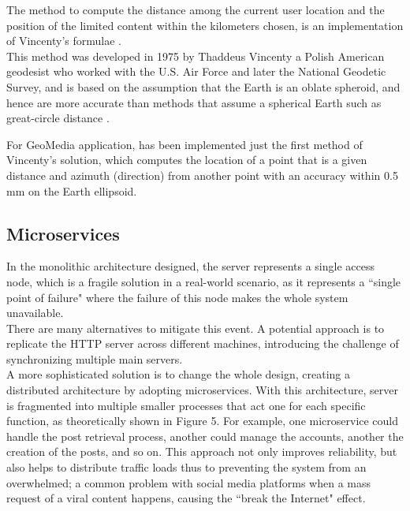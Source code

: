 \documentclass[conference]{IEEEtran}
\begin{document}
The method to compute the distance among the current user location and the position of the limited content within the kilometers chosen, is an implementation of Vincenty's formulae \cite{Vincenty}.
\\
This method was developed in 1975 by Thaddeus Vincenty \cite{ThaddeusVincenty} a Polish American geodesist who worked with the U.S. Air Force and later the National Geodetic Survey, and is based on the assumption that the Earth is an oblate spheroid, and hence are more accurate than methods that assume a spherical Earth such as great-circle distance \cite{GCDWiki}. 

For GeoMedia application, has been implemented just the first method of Vincenty's solution, which computes the location of a point that is a given distance and azimuth (direction) from another point with an accuracy within 0.5 mm on the Earth ellipsoid.


\subsection{Microservices}
In the monolithic architecture designed, the server represents a single access node, which is a fragile solution in a real-world scenario, as it represents a ``single point of failure" where the failure of this node makes the whole system unavailable.
\\
There are many alternatives to mitigate this event. A potential approach is to replicate the HTTP server across different machines, introducing the challenge of synchronizing multiple main servers.
\\
A more sophisticated solution is to change the whole design, creating a distributed architecture by adopting microservices\cite{b6}. With this architecture, server is fragmented into multiple smaller processes that act one for each specific function, as theoretically shown in Figure 5.
For example, one microservice could handle the post retrieval process, another could manage the accounts, another the creation of the posts, and so on. This approach not only improves reliability, but also helps to distribute traffic loads thus to preventing the system from an overwhelmed; a common problem with social media platforms when a mass request of a viral content happens, causing the ``break the Internet" \cite{BreakTheInternet} effect.
\end{document}
